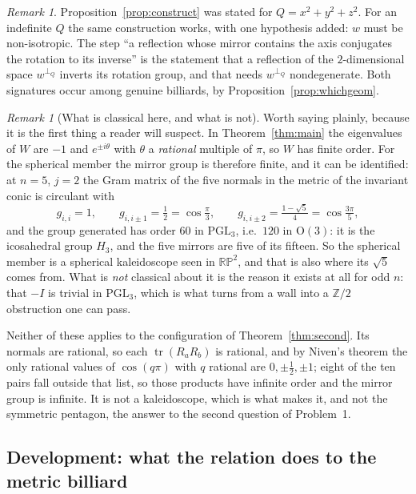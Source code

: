 \documentclass[11pt,a4paper]{article}
\theoremstyle{plain}
\theoremstyle{definition}
\theoremstyle{remark}
\newtheorem{remark}[theorem]{Remark}
\newcommand{\RP}{\mathbb{RP}}
\newcommand{\PGL}{\mathrm{PGL}}
\newcommand{\tr}{\operatorname{tr}}
\begin{document}
\begin{remark}
Proposition~\ref{prop:construct} was stated for $Q=x^2+y^2+z^2$. For an indefinite
$Q$ the same construction works, with one hypothesis added: $w$ must be
non-isotropic. The step ``a reflection whose mirror contains the axis conjugates
the rotation to its inverse'' is the statement that a reflection of the
$2$-dimensional space $w^{\perp_Q}$ inverts its rotation group, and that needs
$w^{\perp_Q}$ nondegenerate. Both signatures occur among genuine billiards, by
Proposition~\ref{prop:whichgeom}.
\end{remark}

\begin{remark}[What is classical here, and what is not]\label{rem:kaleido}
Worth saying plainly, because it is the first thing a reader will suspect. In
Theorem~\ref{thm:main} the eigenvalues of $W$ are $-1$ and $e^{\pm i\theta}$ with
$\theta$ a \emph{rational} multiple of $\pi$, so $W$ has finite order. For the
spherical member the mirror group is therefore finite, and it can be identified: at
$n=5$, $j=2$ the Gram matrix of the five normals in the metric of the invariant
conic is circulant with
\[
  g_{i,i}=1,\qquad g_{i,i\pm1}=\tfrac12=\cos\tfrac\pi3,\qquad
  g_{i,i\pm2}=\tfrac{1-\sqrt5}4=\cos\tfrac{3\pi}5,
\]
and the group generated has order $60$ in $\PGL_3$, i.e.\ $120$ in
$\mathrm{O}(3)$: it is the icosahedral group $H_3$, and the five mirrors are five
of its fifteen. So the spherical member is a spherical kaleidoscope seen in
$\RP^2$, and that is also where its $\sqrt5$ comes from. What is \emph{not}
classical about it is the reason it exists at all for odd $n$: that $-I$ is trivial
in $\PGL_3$, which is what turns \cite[Prop.~1.5]{fie-ex} from a wall into a
$\mathbb{Z}/2$ obstruction one can pass.

Neither of these applies to the configuration of Theorem~\ref{thm:second}. Its
normals are rational, so each $\tr(R_aR_b)$ is rational, and by Niven's theorem the
only rational values of $\cos(q\pi)$ with $q$ rational are $0,\pm\tfrac12,\pm1$;
eight of the ten pairs fall outside that list, so those products have infinite
order and the mirror group is infinite. It is not a kaleidoscope, which is what
makes it, and not the symmetric pentagon, the answer to the second question of
Problem~1.
\end{remark}

\subsection{Development: what the relation does to the metric billiard}
\end{document}
